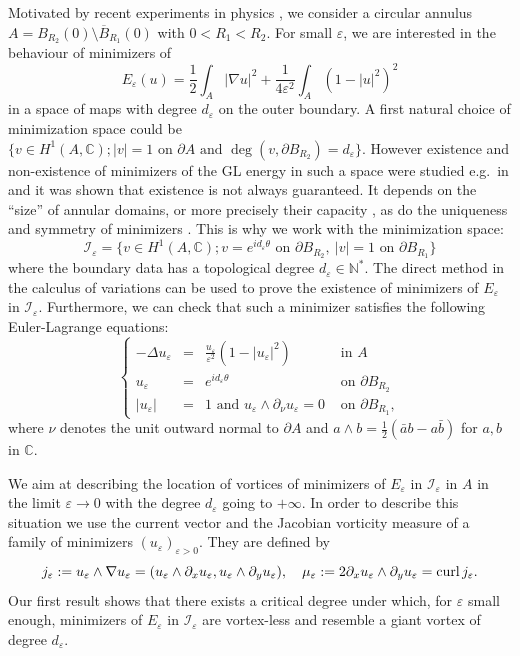 \documentclass[12pt,reqno]{amsart}
\def\I{{\mathcal I}}
\def\e {{\varepsilon}}
\def\curl{{\rm curl\,}}
\def \p {\partial}
\numberwithin{equation}{section}
\begin{document}
  

Motivated by recent experiments in physics \cite{Roati}, we consider a circular annulus \(A=B_{R_2}(0) \setminus \overline{B}_{R_1}(0)\) with \( 0<R_1<R_2\). For small \(\e\), we are interested in the behaviour of minimizers of
\begin{equation}\label{eq:GL_energy}
E_\e(u)=\frac12 \int_A |\nabla u|^2+\frac{1}{4\e^2}\int_A (1-|u|^2)^2
\end{equation}
in a space of maps with degree \(d_\e\) on the outer boundary. A first natural choice of minimization space could be \(\{v\in H^1(A,\mathbb{C}); |v|=1 \text{ on }  \p A \text{ and } \deg (v, \p B_{R_2})=d_\e\}\). However existence and non-existence of minimizers of the GL energy in such a space were studied e.g.\ in \cite{Berlyand_Golovaty_Rybalko_2006,berlmiro,DosSantos_Rodiac_2016,Farina_Mironescu_2013,Golovaty_Berlyand_2002,
Mironescu_2013} and it was shown that existence is not always guaranteed. It depends on the ``size'' of annular domains, or more precisely their capacity \cite{berlmiro}, as do the uniqueness and symmetry of minimizers \cite{Farina_Mironescu_2013,Golovaty_Berlyand_2002}. This is why we work with the minimization space:
\begin{equation*}
\mathcal{I}_\e=\{v\in H^1(A,\mathbb{C}); v=e^{i d_\e\theta} \text{ on } \p B_{R_2}, \ |v|=1 \text{ on } \p B_{R_1}\}
\end{equation*}
where the boundary data  has a topological degree \(d_\e\in \mathbb{N}^*\).
 The direct method in the calculus of variations can be used to prove the existence of minimizers of \(E_\e\) in \(\I_\e\). Furthermore, we can check that such a minimizer satisfies the following Euler-Lagrange equations:
\begin{equation}\label{eq:Euler_Lagrange}
\left\{
\begin{array}{rcll}
-\Delta u_\e &=& \frac{u_\e}{\e^2}(1-|u_\e|^2) & \text{ in } A \\
u_\e &=&e^{i d_\e\theta}  & \text{ on }  \p B_{R_2} \\
|u_\e|&=&1 \text{ and } u_\e\wedge \p_\nu u_\e =0 & \text{ on } \p B_{R_1},
\end{array}
\right.
\end{equation}
 where \(\nu\) denotes the unit outward normal to \( \p A\) and \(a\wedge b=\frac12 (\bar{a}b-a\bar{b})\) for \(a,b\) in \(\mathbb{C}\). 
 
 
 We aim at describing the location of vortices of minimizers of \(E_\e\) in \(\mathcal{I}_\e\) in \(A\) in the limit \(\e\to 0\) with the degree \(d_\e\) going to \(+\infty\). In order to describe this situation we use the current vector and the Jacobian vorticity measure of a family of minimizers \((u_\e)_{\e>0}\). They are defined by
\begin{equation}\label{def:current_vorticity}
j_\e:=u_\e\wedge \nabla u_\e=(u_\e\wedge \p_x u_\e,u_\e\wedge \p_y u_\e) ,\quad \mu_\e:= 2\p_x u_\e \wedge \p_y u_\e=\curl j_\e.
\end{equation}
 Our first result shows that there exists a critical degree under which, for \(\e\) small enough, minimizers of \(E_\e\) in \(\I_\e\) are vortex-less and resemble a giant vortex of degree \(d_\e\).
 
\end{document}
